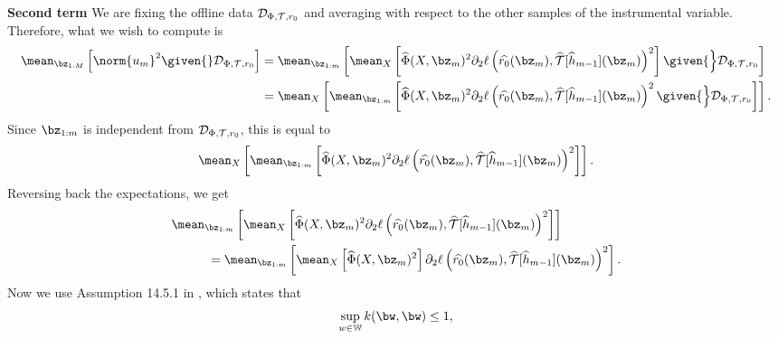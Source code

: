 \textbf{Second term }
We are fixing the offline data $ \mathcal{D}_{ \Phi, \mathcal{T}, r_{ 0 } } $ and averaging with respect to the other samples of the instrumental variable.
Therefore, what we wish to compute is
\begin{align*}
    \mean_{ \bz_{ 1:M } } \left[
        \norm{ u_{ m } }^2
        \given{} \dataoff
    \right]
    &= \mean_{ \bz_{ 1:m } } \left[
        \mean_{ X } \left[
            \hat{ \Phi } ( X, \bz_{ m } )^2
            \partial_{ 2 } \ell \left(
                \hat{ r_{ 0 } } ( \bz_{ m } ),
                \hat{ \mathcal{T} } [ \hat{ h }_{ m-1 } ] ( \bz_{ m } )
            \right)^2
        \right]
        \given{\Big} \dataoff
    \right] \\
    &= \mean_{ X } \left[
        \mean_{ \bz_{ 1:m } } \left[
            \hat{ \Phi } ( X, \bz_{ m } )^2
            \partial_{ 2 } \ell \left(
                \hat{ r_{ 0 } } ( \bz_{ m } ),
                \hat{ \mathcal{T} } [ \hat{ h }_{ m-1 } ] ( \bz_{ m } )
            \right)^2
            \given{\Big} \dataoff
        \right]
    \right]
.\end{align*}
Since $ \bz_{ 1:m } $ is independent from $ \mathcal{D}_{ \Phi, \mathcal{T}, r_{ 0 } } $, this is equal to
\begin{equation*}
    \mean_{ X } \left[
        \mean_{ \bz_{ 1:m } } \left[
            \hat{ \Phi } ( X, \bz_{ m } )^2
            \partial_{ 2 } \ell \left(
                \hat{ r_{ 0 } } ( \bz_{ m } ),
                \hat{ \mathcal{T} } [ \hat{ h }_{ m-1 } ] ( \bz_{ m } )
            \right)^2
        \right]
    \right]
.\end{equation*}
Reversing back the expectations, we get
\begin{align*}
    &\mean_{ \bz_{ 1:m } } \left[
        \mean_{ X } \left[
            \hat{ \Phi } ( X, \bz_{ m } )^2
            \partial_{ 2 } \ell \left(
                \hat{ r_{ 0 } } ( \bz_{ m } ),
                \hat{ \mathcal{T} } [ \hat{ h }_{ m-1 } ] ( \bz_{ m } )
            \right)^2
        \right]
    \right] \\
    &\hspace{1cm}=
    \mean_{ \bz_{ 1:m } } \left[
        \mean_{ X } \left[
            \hat{ \Phi } ( X, \bz_{ m } )^2
        \right]
        \partial_{ 2 } \ell \left(
            \hat{ r_{ 0 } } ( \bz_{ m } ),
            \hat{ \mathcal{T} } [ \hat{ h }_{ m-1 } ] ( \bz_{ m } )
        \right)^2
    \right]
.\end{align*}
Now we use Assumption 14.5.1 in \cite{sugiyama2012}, which states that
\begin{equation*}
    \sup_{ w \in \mathbb{W} } k ( \bw, \bw ) \leq 1
,\end{equation*}
